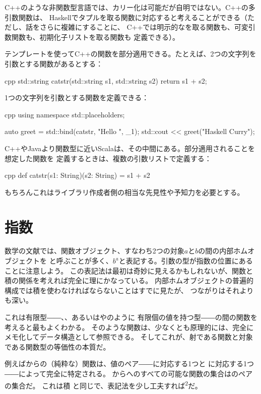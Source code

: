 C++のような非関数型言語では、カリー化は可能だが自明ではない。C++の多引数関数は、
Haskellでタプルを取る関数に対応すると考えることができる（ただし、話をさらに複雑にすることに、
C++では明示的なを取る関数も、可変引数関数も、初期化子リストを取る関数も
定義できる）。

テンプレートを使ってC++の関数を部分適用できる。たとえば、2つの文字列を
引数とする関数があるとする：

\begin{snip}{cpp}
std::string catstr(std::string s1, std::string s2) {
    return s1 + s2;
}
\end{snip}
1つの文字列を引数とする関数を定義できる：

\begin{snip}{cpp}
using namespace std::placeholders;

auto greet = std::bind(catstr, "Hello ", _1);
std::cout << greet("Haskell Curry");
\end{snip}
C++やJavaより関数型に近いScalaは、その中間にある。部分適用されることを想定した関数を
定義するときは、複数の引数リストで定義する：

\begin{snip}{cpp}
def catstr(s1: String)(s2: String) = s1 + s2
\end{snip}
もちろんこれはライブラリ作成者側の相当な先見性や予知力を必要とする。

\section{指数}

数学の文献では、関数オブジェクト、すなわち2つの対象$a$と$b$の間の内部ホムオブジェクトを
と呼ぶことが多く、$b^{a}$と表記する。引数の型が指数の位置にあることに注意しよう。
この表記法は最初は奇妙に見えるかもしれないが、関数と積の関係を考えれば完全に理にかなっている。
内部ホムオブジェクトの普遍的構成では積を使わなければならないことはすでに見たが、
つながりはそれよりも深い。

これは有限型――、、あるいはやのように
有限個の値を持つ型――の間の関数を考えると最もよくわかる。
そのような関数は、少なくとも原理的には、完全にメモ化してデータ構造として参照できる。
そしてこれが、射である関数と対象である関数型の等価性の本質だ。

例えばからの（純粋な）関数は、値のペア――に対応する1つと
に対応する1つ――によって完全に特定される。
からへのすべての可能な関数の集合はのペアの集合だ。
これは積 \times{} と同じで、表記法を少し工夫すれば\textsuperscript{2}だ。

